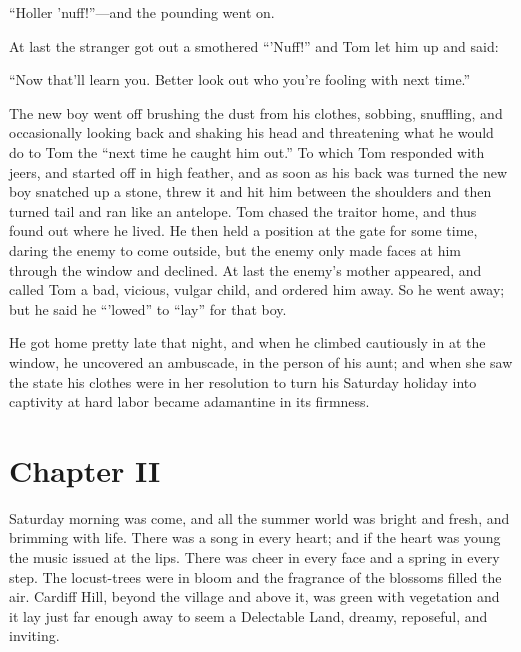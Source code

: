 \documentclass{book}
\begin{document}
“Holler ’nuff!”—and the pounding went on.

At last the stranger got out a smothered “’Nuff!” and Tom let him up and said:

“Now that’ll learn you. Better look out who you’re fooling with next time.”

The new boy went off brushing the dust from his clothes, sobbing, snuffling, and occasionally looking back and shaking his head and threatening what he would do to Tom the “next time he caught him out.” To which Tom responded with jeers, and started off in high feather, and as soon as his back was turned the new boy snatched up a stone, threw it and hit him between the shoulders and then turned tail and ran like an antelope. Tom chased the traitor home, and thus found out where he lived. He then held a position at the gate for some time, daring the enemy to come outside, but the enemy only made faces at him through the window and declined. At last the enemy’s mother appeared, and called Tom a bad, vicious, vulgar child, and ordered him away. So he went away; but he said he “’lowed” to “lay” for that boy.

He got home pretty late that night, and when he climbed cautiously in at the window, he uncovered an ambuscade, in the person of his aunt; and when she saw the state his clothes were in her resolution to turn his Saturday holiday into captivity at hard labor became adamantine in its firmness.

\chapter*{Chapter II}

Saturday morning was come, and all the summer world was bright and fresh, and brimming with life. There was a song in every heart; and if the heart was young the music issued at the lips. There was cheer in every face and a spring in every step. The locust-trees were in bloom and the fragrance of the blossoms filled the air. Cardiff Hill, beyond the village and above it, was green with vegetation and it lay just far enough away to seem a Delectable Land, dreamy, reposeful, and inviting.
\end{document}
